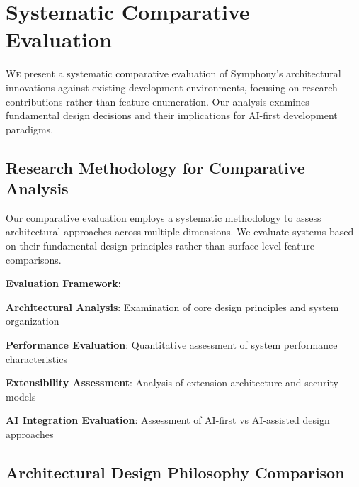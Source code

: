 
\section{Systematic Comparative Evaluation}
\label{sec:comparative-evaluation}

\lettrine{W}{e} present a systematic comparative evaluation of Symphony's architectural innovations against existing development environments, focusing on research contributions rather than feature enumeration. Our analysis examines fundamental design decisions and their implications for AI-first development paradigms.

\subsection{Research Methodology for Comparative Analysis}
\label{subsec:feature-comparison-methodology}

Our comparative evaluation employs a systematic methodology to assess architectural approaches across multiple dimensions. We evaluate systems based on their fundamental design principles rather than surface-level feature comparisons.

\textbf{Evaluation Framework:}

\begin{infobox}[title=Comparative Research Methodology]
\begin{compactlist}
    \item \textbf{Architectural Analysis}: Examination of core design principles and system organization
    \item \textbf{Performance Evaluation}: Quantitative assessment of system performance characteristics
    \item \textbf{Extensibility Assessment}: Analysis of extension architecture and security models
    \item \textbf{AI Integration Evaluation}: Assessment of AI-first vs AI-assisted design approaches
\end{compactlist}
\end{infobox}

\subsection{Architectural Design Philosophy Comparison}
\label{subsec:architectural-philosophy}

